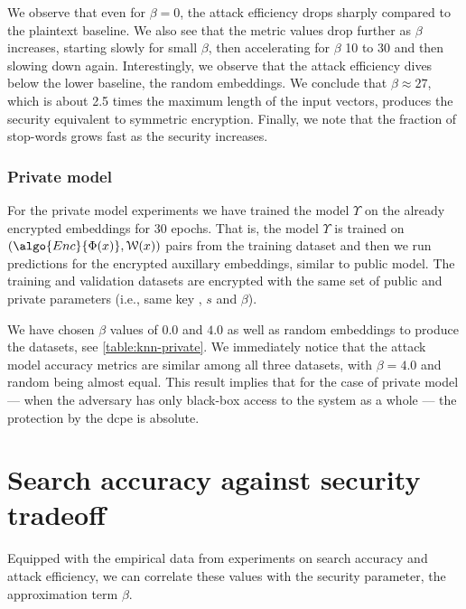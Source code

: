 				

				We observe that even for $\beta = 0$, the attack efficiency drops sharply compared to the plaintext baseline.
				We also see that the metric values drop further as $\beta$ increases, starting slowly for small $\beta$, then accelerating for $\beta$ 10 to 30 and then slowing down again.
				Interestingly, we observe that the attack efficiency dives below the lower baseline, the random embeddings.
				We conclude that $\beta \approx 27$, which is about 2.5 times the maximum length of the input vectors, produces the security equivalent to symmetric encryption.
				Finally, we note that the fraction of stop-words grows fast as the security increases.

			\subsubsection{Private model}

				For the private model experiments we have trained the model $\Upsilon$ on the already encrypted embeddings for 30 epochs.
				That is, the model $\Upsilon$ is trained on $ ( \algo{Enc}{ \Phi(x) }, \mathcal{W}(x) ) $ pairs from the training dataset and then we run predictions for the encrypted auxillary embeddings, similar to public model.
				The training and validation datasets are encrypted with the same set of public and private parameters (i.e., same key \key{}, $s$ and $\beta$).

				

				We have chosen $\beta$ values of $0.0$ and $4.0$ as well as random embeddings to produce the datasets, see \cref{table:knn-private}.
				We immediately notice that the attack model accuracy metrics are similar among all three datasets, with $\beta = 4.0$ and random being almost equal.
				This result implies that for the case of private model --- when the adversary has only black-box access to the system as a whole --- the protection by the \acrshort{dcpe} is absolute.

	\section{Search accuracy against security tradeoff}

		Equipped with the empirical data from experiments on search accuracy and attack efficiency, we can correlate these values with the security parameter, the approximation term $\beta$.

